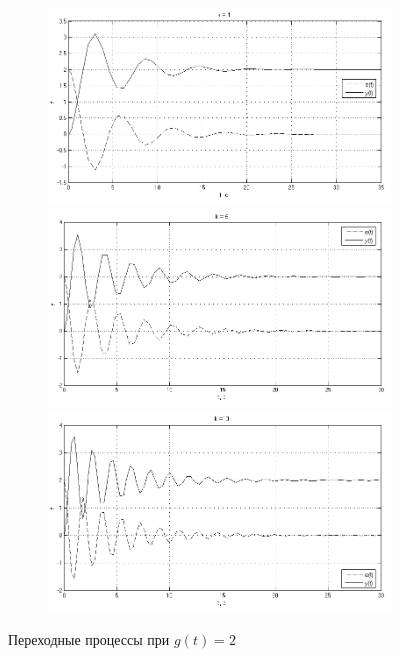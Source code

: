 \documentclass[a4paper, 11pt, russian]{article}
\begin{document}
    \begin{figure}[hp!]
        \centering
        \begin{subfigure}[h]{0.9\textwidth}
            \includegraphics[width = \textwidth]{constInput1ast1k.png}\\
            \includegraphics[width = \textwidth]{constInput1ast5k.png}\\
            \includegraphics[width = \textwidth]{constInput1ast10k.png}
        \end{subfigure}
        \caption{Переходные процессы при $g(t) = 2$}
    \end{figure}
    \clearpage
\end{document}
